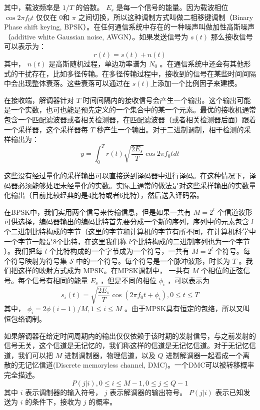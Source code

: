 \documentclass[10pt,a4paper,UTF8]{article}
\begin{document}
其中，载波频率是 \(1/T\) 的倍数。 \(E_{s}\) 是每一个信号的能量。因为载波相位 \(\cos 2\pi f_{0}t\) 仅仅在 \(0\)和 \(\pi\) 之间切换，所以这种调制方式叫做二相移键调制（Binary Phase shift keying, BPSK）。在任何通信系统中存在的一种噪声叫做加性高斯噪声（additive white Gaussian noise, AWGN）。如果发送信号为 \(s(t)\) 那么接收信号可以表示为： \[ r(t) = s(t) + n(t)\] 其中， \(n(t)\) 是高斯随机过程，单边功率谱为 \(N_{0}\) 。在通信系统中还会有其他形式的干扰存在，比如多径传输。在多径传输过程中，接收到的信号在某些时间间隔中会出现整体衰落。这些衰落可以通过在 \(s(t)\)上添加一个比例因子来建模。

在接收端，解调器针对 \(T\) 时间间隔内的接收信号会产生一个输出。这个输出可能是一个实数，也可也能是预先定义的一个集合中的某一个元素。最优的接收机通常包含一个匹配滤波器或者相关检测器，在匹配滤波器（或者相关检测器后面）跟着一个采样器，这个采样器每 \(T\) 秒产生一个输出。对于二进制调制，相干检测的采样输出为：
\begin{equation}
\label{eq:20161113equ01_03}
y = \int_{0}^{T}r(t) \sqrt{\frac{2E_{s}}{T}}\cos{2\pi f_{0}t dt}
\end{equation}

这些没有经过量化的采样输出可以直接送到译码器中进行译码。在这种情况下，译码器必须能够处理未经量化的实数。实际上通常的做法是对这些采样输出的实数量化输出（目前比较经典的是4比特或者6比特），然后送入译码器。

在BPSK中，我们实用两个信号来传输信息，但是如果一共有 \(M=2^{l}\) 个信道波形可供选择，编码器输出的编码比特首先要分成一个新的序列，序列中的元素包含 \(l\) 个二进制比特构成的字节（这里的字节和计算机的字节有所不同，在计算机科学中一个字节一般是8个比特，在这里我们称 \(l\)个比特构成的二进制序列也为一个字节 ）。我们把每 \(l\) 个比特构成的一个字节成为一个符号，一共有 \(M=2^{l}\) 个符号。每个符号映射为符号集 \(\mathcal{S}\) 中的一个符号。每个符号是一个脉冲波形，时长为 \(T\) 。我们把这样的映射方式成为 MPSK。在MPSK调制中， 一共有 \(M\) 个相位的正弦信号。每个信号有相同的能量 \(E_{s}\) ，但是不同的相位 \(\phi_{i}\) ，可以表示为 \[s_{i}(t) = \sqrt{\frac{2E_{s}}{T}} \cos{(2\pi f_{0}t + \phi_{i})}, 0\leq t \leq T\] 其中， \(\phi_{i} = 2\phi(i-1)/M, 1\leq i \leq M\) 。由于MPSK具有恒定的包络，所以又叫恒包络调制。 

如果解调器在给定时间周期内的输出仅仅依赖于该时期的发射信号，与之前发射的信号无关，这个信道是无记忆的，我们称这样的信道是无记忆信道。对于无记忆信道，我们可以把 \(M\) 进制调制器，物理信道，以及 \(Q\) 进制解调器一起看成一个离散的无记忆信道(Discrete memoryless channel, DMC)。一个DMC可以被转移概率完全描述。 \[P(j|i), 0\leq i \leq M-1, 0\leq j \leq Q-1\] 其中 \(i\) 表示调制器的输入符号， \(j\) 表示解调器的输出符号。 \(P(j|i)\) 表示已知发送为 \(i\) 的条件下，接收为 \(j\) 的概率。
\end{document}
